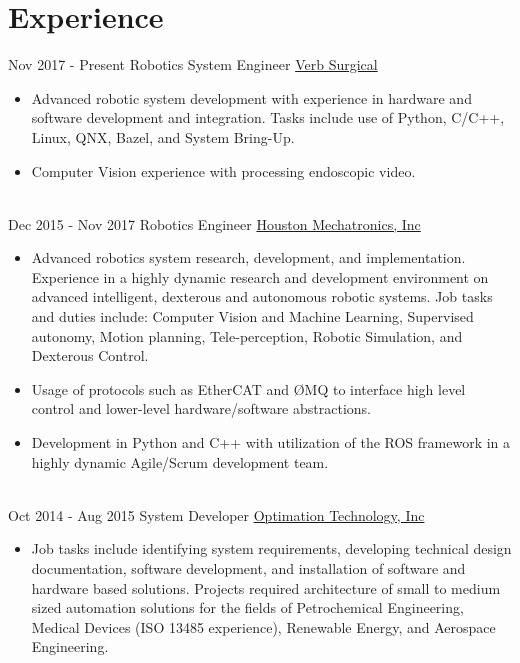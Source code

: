 \documentclass[letterpaper]{twentysecondcv} %
\begin{document}
\makeprofile %


\section{Experience}

\begin{twenty} %
	\twentyitem
	{Nov 2017 -}
	{Present}
	{Robotics System Engineer}
	{\href{http://verbsurgical.com/}{Verb Surgical}}
	{}
	{\begin{itemize}
			\item Advanced robotic system development with experience in hardware and software development and integration. Tasks include use of Python, C/C++, Linux, QNX, Bazel, and System Bring-Up.
			\item Computer Vision experience with processing endoscopic video. 
		\end{itemize}}
		\\
		\twentyitem
		{Dec 2015 -}
		{Nov 2017}
		{Robotics Engineer}
		{\href{https://houstonmechatronics.com/}{Houston Mechatronics, Inc}}
		{}
		{
			{\begin{itemize}
					\item Advanced robotics system research, development, and implementation. Experience in a highly dynamic research and development environment on advanced intelligent, dexterous and autonomous robotic systems. Job tasks and duties include: Computer Vision and Machine Learning, Supervised autonomy, Motion planning, Tele-perception, Robotic Simulation, and Dexterous Control. 
					\item Usage of protocols such as EtherCAT and ØMQ to interface high level control and lower-level hardware/software abstractions. 
					\item Development in Python and C++ with utilization of the ROS framework in a highly dynamic Agile/Scrum development team.
				\end{itemize}}
			}
			\\   
			\twentyitem
			{Oct 2014 -}
			{Aug 2015}
			{System Developer}
			{\href{http://optimation.us/}{Optimation Technology, Inc}}
			{}
			{
				{\begin{itemize}
						\item Job tasks include identifying system requirements, developing technical design documentation, software development, and installation of software and hardware based solutions. Projects required architecture of small to medium sized automation solutions for the fields of Petrochemical Engineering, Medical Devices (ISO 13485 experience), Renewable Energy, and Aerospace Engineering.

\end{itemize}}}
\end{twenty}
\end{document}
